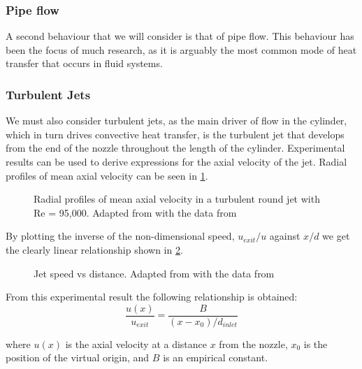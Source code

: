  
\subsubsection{Pipe flow}

A second behaviour that we will consider is that of pipe flow. This behaviour has been the focus of much research, as it is arguably the most common mode of heat transfer that occurs in fluid systems.

\subsubsection{Turbulent Jets}
\label{sec:turbulentJets}
We must also consider turbulent jets, as the main driver of flow in the cylinder, which in turn drives convective heat transfer, is the turbulent jet that develops from the end of the nozzle throughout the length of the cylinder. Experimental results can be used to derive expressions for the axial velocity of the jet. Radial profiles of  mean axial velocity can be seen in \cref{fig:radialProfile}.

\begin{figure}[h]
\begin{centering}
\caption{Radial profiles of mean axial velocity in a turbulent round jet with Re = 95,000. Adapted from \cite{pope2000} with the data from \cite{hussein1994}}
\label{fig:radialProfile}
\end{centering}
\end{figure}


\noindent By plotting the inverse of the non-dimensional speed, $u_{exit}/u$ against $x/d$ we get the clearly linear relationship shown in \cref{fig:jetSpeed}.

\begin{figure}[h]
\begin{centering}
\caption{Jet speed vs distance. Adapted from \cite{pope2000} with the data from \cite{hussein1994}}
\label{fig:jetSpeed}
\end{centering}
\end{figure}

\noindent From this experimental result the following relationship is obtained: 
\begin{equation}
\label{equ:axialSpeed}
\frac{u(x)}{u_{exit}} = \frac{B}{\left(x-x_0\right)/d_{inlet}}
\end{equation}

\noindent where $u(x)$ is the axial velocity at a distance $x$ from the nozzle, $x_0$ is the position of the virtual origin, and $B$ is an empirical constant.

